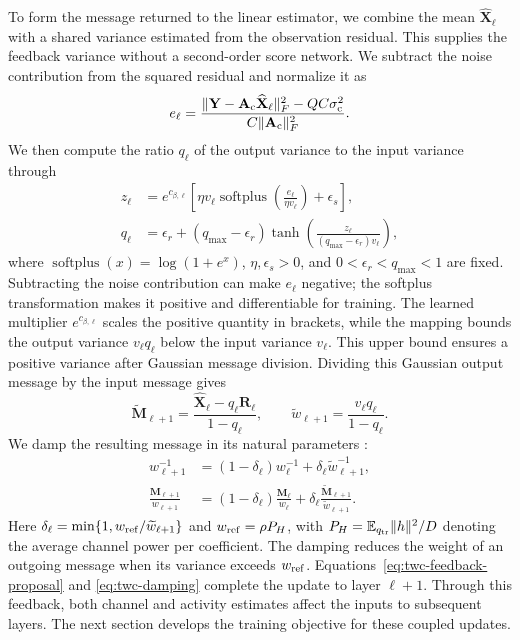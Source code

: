 To form the message returned to the linear estimator, we combine
the mean $\widehat{\mathbf X}_\ell$ with a shared variance estimated
from the observation residual. This supplies the feedback variance
without a second-order score network. We subtract the noise
contribution from the squared residual and normalize it as
\begin{equation}
 e_\ell=\frac{\|\mathbf Y-\mathbf A_{\rm c}\widehat{\mathbf X}_\ell\|_F^2
                   -QC\sigma_{\rm c}^2}
                  {C\|\mathbf A_{\rm c}\|_F^2}.
 \label{eq:twc-residual-scale}
\end{equation}
We then compute the ratio $q_\ell$ of the output variance to the input
variance through
\begin{equation}
 \begin{aligned}
 z_\ell&=e^{c_{\beta,\ell}}
 \left[\eta v_\ell\operatorname{softplus}
       \!\left(\frac{e_\ell}{\eta v_\ell}\right)+\epsilon_s\right],\\
 q_\ell&=\epsilon_r+(q_{\max}-\epsilon_r)
 \tanh\!\left(\frac{z_\ell}{(q_{\max}-\epsilon_r)v_\ell}\right),
 \end{aligned}
 \label{eq:twc-feedback-ratio}
\end{equation}
where $\operatorname{softplus}(x)=\log(1+e^x)$,
$\eta,\epsilon_s>0$, and $0<\epsilon_r<q_{\max}<1$ are fixed.
Subtracting the noise contribution can make $e_\ell$ negative;
the softplus transformation makes it positive and differentiable
for training.
The learned multiplier $e^{c_{\beta,\ell}}$ scales the positive
quantity in brackets, while the mapping bounds the output variance
$v_\ell q_\ell$ below the input variance $v_\ell$. This upper bound
ensures a positive variance after Gaussian message division.
Dividing this Gaussian output message by the input message gives
\begin{equation}
 \widetilde{\mathbf M}_{\ell+1}
 =\frac{\widehat{\mathbf X}_\ell-q_\ell\mathbf R_\ell}{1-q_\ell},
 \qquad
 \widetilde w_{\ell+1}=\frac{v_\ell q_\ell}{1-q_\ell}.
 \label{eq:twc-feedback-proposal}
\end{equation}
We damp the resulting message in its natural parameters
\cite{vehtari2020}:
\begin{equation}
 \begin{aligned}
 w_{\ell+1}^{-1}&=(1-\delta_\ell)w_\ell^{-1}
                    +\delta_\ell\widetilde w_{\ell+1}^{-1},\\
 \frac{\mathbf M_{\ell+1}}{w_{\ell+1}}
 &=(1-\delta_\ell)\frac{\mathbf M_\ell}{w_\ell}
       +\delta_\ell\frac{\widetilde{\mathbf M}_{\ell+1}}
                           {\widetilde w_{\ell+1}}.
 \end{aligned}
 \label{eq:twc-damping}
\end{equation}
Here $\delta_\ell=\min\{1,w_{\rm ref}/\widetilde w_{\ell+1}\}$
and $w_{\rm ref}=\rho P_H$, with
$P_H=\mathbb{E}_{q_{\rm tr}}\|h\|^2/D$ denoting the average channel power
per coefficient.
The damping reduces the weight of an outgoing message when its
variance exceeds $w_{\rm ref}$. Equations~\eqref{eq:twc-feedback-proposal}
and \eqref{eq:twc-damping} complete the update to layer $\ell+1$.
Through this feedback, both channel and activity estimates affect
the inputs to subsequent layers. The next section develops the
training objective for these coupled updates.
